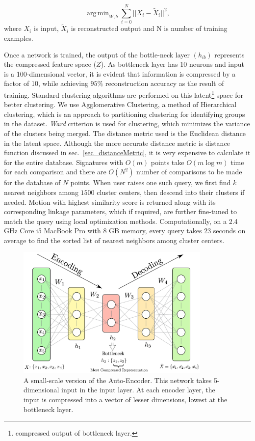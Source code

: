 \documentclass[twocolumn,10pt]{asme2ej}
\DeclareMathOperator*{\argminA}{arg\,min}
\begin{document}
\begin{equation}\label{nnloss}
  \argminA_{W, b} \sum_{i=0}^{N} || X_i - \tilde{X}_i ||^2,
\end{equation}
where $X_i$ is input, $\tilde{X}_i$ is reconstructed output and N is number of training examples.


Once a network is trained, the output of the bottle-neck layer $(h_{ib})$ represents the compressed feature space ($Z$).
As bottleneck layer has 10 neurons and input is a 100-dimensional vector, it is evident that information is compressed by a factor of 10, while achieving $95\%$ reconstruction accuracy as the result of training.
Standard clustering algorithms are performed on this latent\footnote{compressed output of bottleneck layer.} space for better clustering\cite{song2013}.
We use Agglomerative Clustering, a method of Hierarchical clustering, which is an approach to partitioning clustering for identifying groups in the dataset.
\emph{Ward}\cite{ward1963} criterion is used for clustering, which minimizes the variance of the clusters being merged.
The distance metric used is the Euclidean distance in the latent space.
Although the more accurate distance metric is distance function discussed in sec.~\ref{sec_distanceMetric}, it is very expensive to calculate it for the entire database.
Signatures with ${O}(m)$ points take ${O}(m\log{}m)$ time for each comparison and there are ${O}(N^2)$ number of comparisons to be made for the database of $N$ points.
When user raises one such query, we first find $k$ nearest neighbors among $1500$ cluster centers, then descend into their clusters if needed.
Motion with highest similarity score is returned along with its corresponding linkage parameters, which if required, are further fine-tuned to match the query using local optimization methods. Computationally, on a 2.4 GHz Core i5 MacBook Pro with 8 GB memory, every query takes 23 seconds on average to find the sorted list of nearest neighbors among cluster centers.

\begin{figure}
\centering
\includegraphics[width=270pt]{figure/fig_auto_encoder.eps}
  \caption{A small-scale version of the Auto-Encoder. This network takes 5-dimensional input in the input layer. At each encoder layer, the input is compressed into a vector of lesser dimensions, lowest at the bottleneck layer.}
\label{autoEncoder}
\end{figure}
\end{document}
